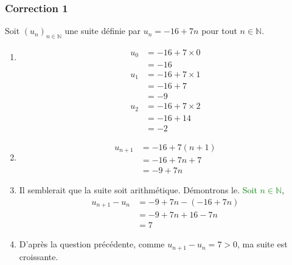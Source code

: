 \documentclass[15pt, mathserif]{beamer}
\newcommand{\N}{\mathbb{N}}			%
\newcommand{\st}[1]{$(#1_n)_{n \in \N}$}
\begin{document}
\begin{frame}
\vspace{-10mm}
	\frametitle{Correction 1}
\vspace*{0.5cm} 
 
 Soit \st{u} une suite définie par $u_n=-16+7n$ pour tout $n \in \N$. 
 
 \begin{enumerate} 
 	 \item \begin{multicols}{3} 
 
 \begin{align*} 
 u_0 &=-16+7\times 0 \\ &= -16\end{align*}  
 \columnbreak 
 \begin{align*} 
 u_1 &= -16+7\times 1 \\ 
 &= -16+7\\ 
 &= -9 
 \end{align*}  
 \columnbreak 
 \begin{align*} 
 u_2 &= -16+7\times 2 \\ 
 &= -16+14\\ 
 &= -2 
 \end{align*} 
 \end{multicols} 
 \vfil 
 	 \item \begin{align*} u_{n+1} &= -16+7(n+1) \\ &=  -16+7n +7 \\ &=  -9+7n 
 \end{align*} \end{enumerate} 
 
 \end{frame} 
 
 \begin{frame}  
 \begin{enumerate} \setcounter{enumi}{2}  
 	 \item Il semblerait que la suite soit arithmétique. Démontrons le.  \textcolor{green}{Soit $n \in \N$}, \begin{align*} 
 u_{n+1}-u_n &=  -9+7n -\left(-16+7n \right) \\ 
 &= -9+7n +16-7n \\ 
 &= 7 
 \end{align*} 
 \vfil 
 	 \item  D'après la question précédente, comme $u_{n+1}-u_n= 7>0$, ma suite est croissante.
 
 \end{enumerate} \end{frame}
\end{document}
